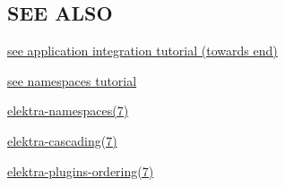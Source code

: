 \subsection*{S\+E\+E A\+L\+S\+O}


\begin{DoxyItemize}
\item \hyperlink{doc_tutorials_application-integration_md}{see application integration tutorial (towards end)}
\item \hyperlink{doc_tutorials_namespaces_md}{see namespaces tutorial}
\item \hyperlink{md_doc_help_elektra-namespaces_doc_help_elektra-namespaces_md}{elektra-\/namespaces(7)}
\item \hyperlink{md_doc_help_elektra-cascading_doc_help_elektra-cascading_md}{elektra-\/cascading(7)}
\item \hyperlink{md_doc_help_elektra-plugins-ordering_doc_help_elektra-plugins-ordering_md}{elektra-\/plugins-\/ordering(7)} 
\end{DoxyItemize}